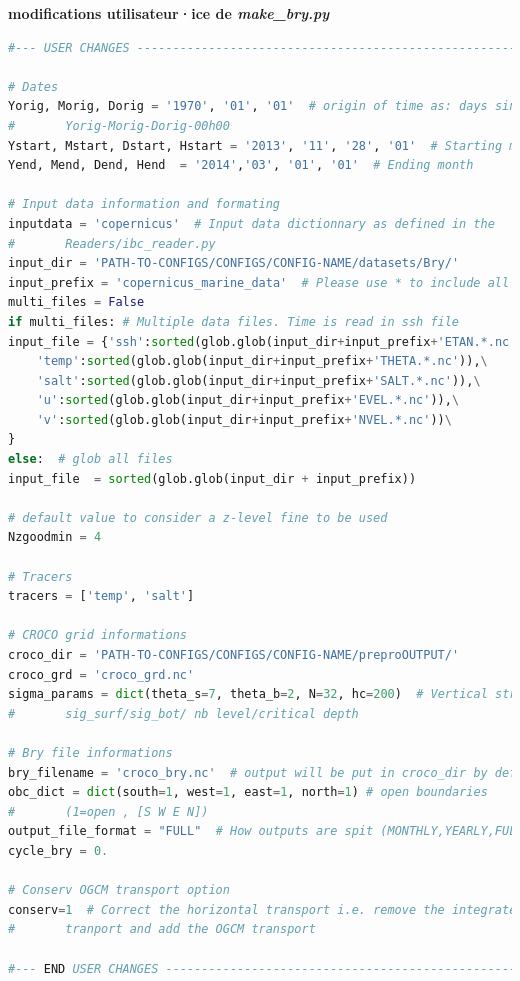 \documentclass[10pt,a4paper,titlepage]{article}
\begin{document}
\begin{codeEnv}{\textbf{modifications utilisateur·ice de \textit{make\_bry.py}}}
\begin{lstlisting}[language=python]
#--- USER CHANGES ---------------------------------------------------------

# Dates
Yorig, Morig, Dorig = '1970', '01', '01'  # origin of time as: days since
#       Yorig-Morig-Dorig-00h00
Ystart, Mstart, Dstart, Hstart = '2013', '11', '28', '01'  # Starting month
Yend, Mend, Dend, Hend  = '2014','03', '01', '01'  # Ending month

# Input data information and formating
inputdata = 'copernicus'  # Input data dictionnary as defined in the
#       Readers/ibc_reader.py
input_dir = 'PATH-TO-CONFIGS/CONFIGS/CONFIG-NAME/datasets/Bry/'
input_prefix = 'copernicus_marine_data'  # Please use * to include all files
multi_files = False
if multi_files: # Multiple data files. Time is read in ssh file
input_file = {'ssh':sorted(glob.glob(input_dir+input_prefix+'ETAN.*.nc')),\
    'temp':sorted(glob.glob(input_dir+input_prefix+'THETA.*.nc')),\
    'salt':sorted(glob.glob(input_dir+input_prefix+'SALT.*.nc')),\
    'u':sorted(glob.glob(input_dir+input_prefix+'EVEL.*.nc')),\
    'v':sorted(glob.glob(input_dir+input_prefix+'NVEL.*.nc'))\
}
else:  # glob all files
input_file  = sorted(glob.glob(input_dir + input_prefix))

# default value to consider a z-level fine to be used
Nzgoodmin = 4

# Tracers
tracers = ['temp', 'salt']

# CROCO grid informations
croco_dir = 'PATH-TO-CONFIGS/CONFIGS/CONFIG-NAME/preproOUTPUT/'
croco_grd = 'croco_grd.nc'
sigma_params = dict(theta_s=7, theta_b=2, N=32, hc=200)  # Vertical streching,
#       sig_surf/sig_bot/ nb level/critical depth

# Bry file informations
bry_filename = 'croco_bry.nc'  # output will be put in croco_dir by default
obc_dict = dict(south=1, west=1, east=1, north=1) # open boundaries
#       (1=open , [S W E N])
output_file_format = "FULL"  # How outputs are spit (MONTHLY,YEARLY,FULL)
cycle_bry = 0.

# Conserv OGCM transport option
conserv=1  # Correct the horizontal transport i.e. remove the integrated
#       tranport and add the OGCM transport

#--- END USER CHANGES -----------------------------------------------------
\end{lstlisting}
\end{codeEnv}
\end{document}

